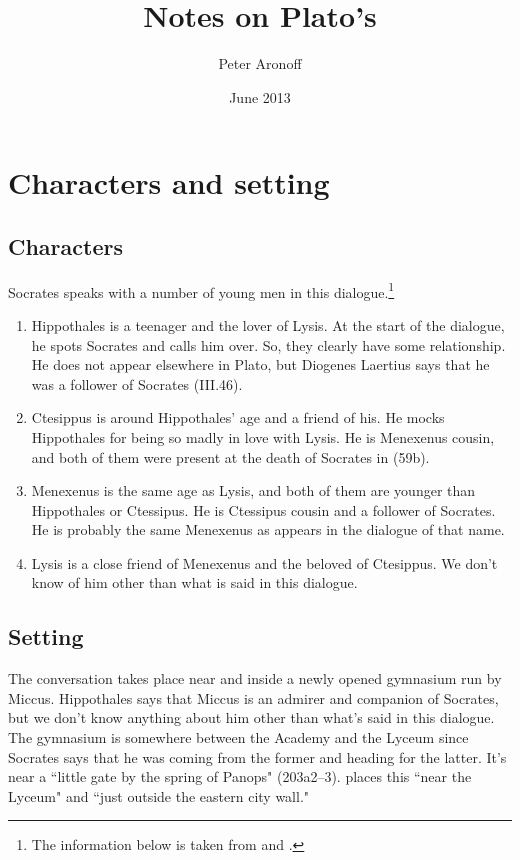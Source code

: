 \documentclass[11pt]{article}
\begin{document}
\begin{titlepage}
\title{Notes on Plato's }
\author{Peter Aronoff}
\date{June 2013}
\maketitle
\end{titlepage}

\section{Characters and setting}

\subsection{Characters}

Socrates speaks with a number of young men in this dialogue.\footnote{The information below is taken from \citet{race1983} and \citet{watt1987}.}

\begin{enumerate}
    \item Hippothales is a teenager and the lover of Lysis.  At the start of the dialogue, he spots Socrates and calls him over.  So, they clearly have some relationship.  He does not appear elsewhere in Plato, but Diogenes Laertius says that he was a follower of Socrates (III.46).
    \item Ctesippus is around Hippothales' age and a friend of his.  He mocks Hippothales for being so madly in love with Lysis.  He is Menexenus cousin, and both of them were present at the death of Socrates in  (59b).
    \item Menexenus is the same age as Lysis, and both of them are younger than Hippothales or Ctessipus.  He is Ctessipus cousin and a follower of Socrates.  He is probably the same Menexenus as appears in the dialogue of that name.
    \item Lysis is a close friend of Menexenus and the beloved of Ctesippus.  We don't know of him other than what is said in this dialogue.
\end{enumerate}

\subsection{Setting}

The conversation takes place near and inside a newly opened gymnasium run by Miccus.  Hippothales says that Miccus is an admirer and companion of Socrates, but we don't know anything about him other than what's said in this dialogue.  The gymnasium is somewhere between the Academy and the Lyceum since Socrates says that he was coming from the former and heading for the latter.  It's near a ``little gate by the spring of Panops" (203a2--3).  \citet{race1983} places this ``near the Lyceum" and ``just outside the eastern city wall."
\end{document}
